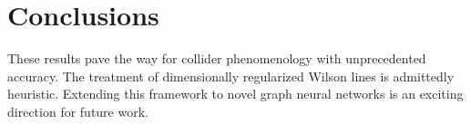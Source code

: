 \section{Conclusions}\label{sec:conclusions}

These results pave the way for collider phenomenology with unprecedented
accuracy. The treatment of dimensionally regularized Wilson lines is
admittedly heuristic. Extending this framework to novel graph neural
networks is an exciting direction for future work.

